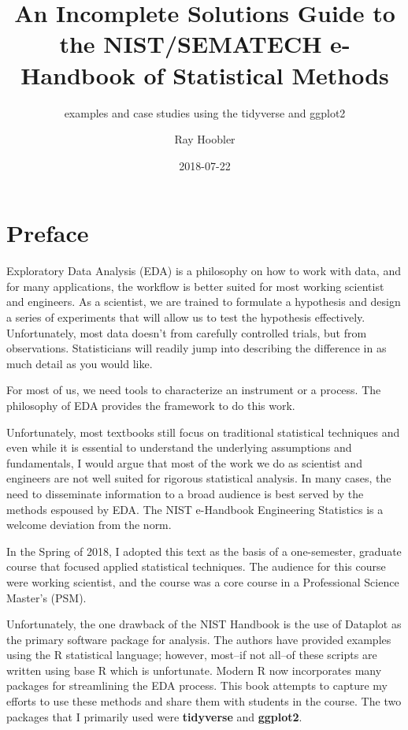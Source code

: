 \documentclass[]{book}
\title{An Incomplete Solutions Guide to the NIST/SEMATECH e-Handbook of
Statistical Methods}
\subtitle{examples and case studies using the tidyverse and ggplot2}
\author{Ray Hoobler}
\date{2018-07-22}
\theoremstyle{definition}
\theoremstyle{definition}
\theoremstyle{definition}
\theoremstyle{remark}
\begin{document}
\maketitle

{
\setcounter{tocdepth}{1}
\tableofcontents
}
\hypertarget{preface}{%
\chapter*{Preface}\label{preface}}

Exploratory Data Analysis (EDA) is a philosophy on how to work with
data, and for many applications, the workflow is better suited for most
working scientist and engineers. As a scientist, we are trained to
formulate a hypothesis and design a series of experiments that will
allow us to test the hypothesis effectively. Unfortunately, most data
doesn't from carefully controlled trials, but from observations.
Statisticians will readily jump into describing the difference in as
much detail as you would like.

For most of us, we need tools to characterize an instrument or a
process. The philosophy of EDA provides the framework to do this work.

Unfortunately, most textbooks still focus on traditional statistical
techniques and even while it is essential to understand the underlying
assumptions and fundamentals, I would argue that most of the work we do
as scientist and engineers are not well suited for rigorous statistical
analysis. In many cases, the need to disseminate information to a broad
audience is best served by the methods espoused by EDA. The NIST
e-Handbook Engineering Statistics is a welcome deviation from the norm.

In the Spring of 2018, I adopted this text as the basis of a
one-semester, graduate course that focused applied statistical
techniques. The audience for this course were working scientist, and the
course was a core course in a Professional Science Master's (PSM).

Unfortunately, the one drawback of the NIST Handbook is the use of
Dataplot as the primary software package for analysis. The authors have
provided examples using the R statistical language; however, most--if
not all--of these scripts are written using base R which is unfortunate.
Modern R now incorporates many packages for streamlining the EDA
process. This book attempts to capture my efforts to use these methods
and share them with students in the course. The two packages that I
primarily used were \textbf{tidyverse} and \textbf{ggplot2}.
\end{document}
